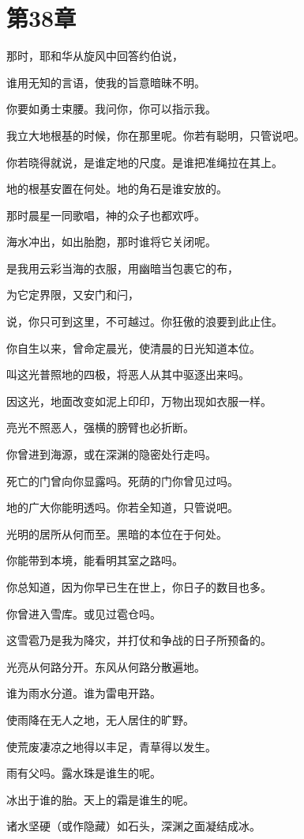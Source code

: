 \documentclass[12pt,oneside]{book}
\begin{document}
\chapter{第38章}
那时，耶和华从旋风中回答约伯说，

谁用无知的言语，使我的旨意暗昧不明。

你要如勇士束腰。我问你，你可以指示我。

我立大地根基的时候，你在那里呢。你若有聪明，只管说吧。

你若晓得就说，是谁定地的尺度。是谁把准绳拉在其上。

地的根基安置在何处。地的角石是谁安放的。

那时晨星一同歌唱，神的众子也都欢呼。

海水冲出，如出胎胞，那时谁将它关闭呢。

是我用云彩当海的衣服，用幽暗当包裹它的布，

为它定界限，又安门和闩，

说，你只可到这里，不可越过。你狂傲的浪要到此止住。

你自生以来，曾命定晨光，使清晨的日光知道本位。

叫这光普照地的四极，将恶人从其中驱逐出来吗。

因这光，地面改变如泥上印印，万物出现如衣服一样。

亮光不照恶人，强横的膀臂也必折断。

你曾进到海源，或在深渊的隐密处行走吗。

死亡的门曾向你显露吗。死荫的门你曾见过吗。

地的广大你能明透吗。你若全知道，只管说吧。

光明的居所从何而至。黑暗的本位在于何处。

你能带到本境，能看明其室之路吗。

你总知道，因为你早已生在世上，你日子的数目也多。

你曾进入雪库。或见过雹仓吗。

这雪雹乃是我为降灾，并打仗和争战的日子所预备的。

光亮从何路分开。东风从何路分散遍地。

谁为雨水分道。谁为雷电开路。

使雨降在无人之地，无人居住的旷野。

使荒废凄凉之地得以丰足，青草得以发生。

雨有父吗。露水珠是谁生的呢。

冰出于谁的胎。天上的霜是谁生的呢。

诸水坚硬（或作隐藏）如石头，深渊之面凝结成冰。
\end{document}
